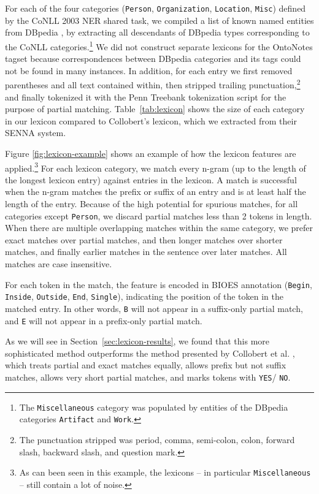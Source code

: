 \documentclass[11pt,letterpaper]{article}
\begin{document}
For each of the four categories ({\tt Person}, {\tt Organization}, {\tt Location}, {\tt Misc}) defined by the CoNLL 2003 NER shared task, we compiled a list of known named entities from DBpedia \cite{auer2007dbpedia}, by extracting all descendants of DBpedia types corresponding to the CoNLL categories.\footnote{The {\tt Miscellaneous} category was populated by entities of the DBpedia categories {\tt Artifact} and {\tt Work}.} We did not construct separate lexicons for the OntoNotes tagset because correspondences between DBpedia categories and its tags could not be found in many instances. In addition, for each entry we first removed parentheses and all text contained within, then stripped trailing punctuation,\footnote{The punctuation stripped was period, comma, semi-colon, colon, forward slash, backward slash, and question mark.} and finally tokenized it with the Penn Treebank tokenization script for the purpose of partial matching. Table~\ref{tab:lexicon} shows the size of each category in our lexicon compared to Collobert's lexicon, which we extracted from their SENNA system.

Figure \ref{fig:lexicon-example} shows an example of how the lexicon features are applied.\footnote{As can been seen in this example, the lexicons \--- in particular {\tt Miscellaneous} \--- still contain a lot of noise. 
} For each lexicon category, we match every n-gram (up to the length of the longest lexicon entry) against entries in the lexicon. A match is successful when the n-gram matches the prefix or suffix of an entry and is at least half the length of the entry. Because of the high potential for spurious matches, for all categories except {\tt Person}, we discard partial matches less than 2 tokens in length. When there are multiple overlapping matches within the same category, we prefer exact matches over partial matches, and then longer matches over shorter matches, and finally earlier matches in the sentence over later matches. All matches are case insensitive.%

For each token in the match, the feature is encoded in BIOES annotation ({\tt Begin}, {\tt Inside}, {\tt Outside}, {\tt End}, {\tt Single}), indicating the position of the token in the matched entry. In other words, {\tt B} will not appear in a suffix-only partial match, and {\tt E} will not appear in a prefix-only partial match.

As we will see in Section~\ref{sec:lexicon-results}, we found that this more sophisticated method outperforms the method presented by Collobert et al. , which treats partial and exact matches equally, allows prefix but not suffix matches, allows very short partial matches, and marks tokens with {\tt YES}/{ \tt NO}.
\end{document}
